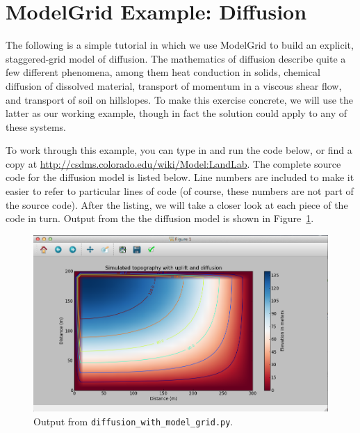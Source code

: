 \documentclass[12pt]{article}
\newcommand{\code}[1]{{\tt #1}}
\begin{document}
\section{ModelGrid Example: Diffusion} 

The following is a simple tutorial in which we use ModelGrid to build an explicit, staggered-grid model of diffusion. The mathematics of diffusion describe quite a few different phenomena, among them heat conduction in solids, chemical diffusion of dissolved material, transport of momentum in a viscous shear flow, and transport of soil on hillslopes. To make this exercise concrete, we will use the latter as our working example, though in fact the solution could apply to any of these systems.

To work through this example, you can type in and run the code below, or find a copy at \url{http://csdms.colorado.edu/wiki/Model:LandLab}. The complete source code for the diffusion model is listed below. Line numbers are included to make it easier to refer to particular lines of code (of course, these numbers are not part of the source code). After the listing, we will take a closer look at each piece of the code in turn. Output from the the diffusion model is shown in Figure~\ref{basicdiffmod}.

 \begin{figure}[h!]
    \centering
    \includegraphics[scale=0.45]{basic_diffusion_example.png}
    \caption{Output from \code{diffusion\_with\_model\_grid.py}.}
   \label{basicdiffmod}
\end{figure}




\end{document}
